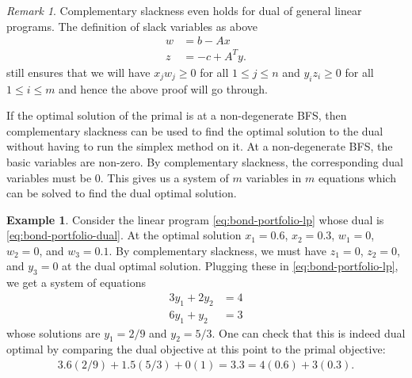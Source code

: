 \documentclass[
]{book}
\theoremstyle{definition}
\theoremstyle{definition}
\newtheorem{example}{Example}[chapter]
\theoremstyle{definition}
\theoremstyle{definition}
\theoremstyle{remark}
\newtheorem*{remark}{Remark}
\begin{document}
\begin{remark}
Complementary slackness even holds for dual of general linear programs. The definition of slack variables as above
\begin{align*}
  w &= b - A x \\ 
  z &= -c + A^T y.
\end{align*}
still ensures that we will have \(x_j w_j \ge 0\) for all \(1 \le j \le n\) and \(y_i z_i \ge 0\) for all \(1 \le i \le m\) and hence the above proof will go through.
\end{remark}

If the optimal solution of the primal is at a non-degenerate BFS, then complementary slackness can be used to find the optimal solution to the dual without having to run the simplex method on it.
At a non-degenerate BFS, the basic variables are non-zero.
By complementary slackness, the corresponding dual variables must be 0.
This gives us a system of \(m\) variables in \(m\) equations which can be solved to find the dual optimal solution.

\begin{example}
Consider the linear program \eqref{eq:bond-portfolio-lp} whose dual is \eqref{eq:bond-portfolio-dual}. At the optimal solution \(x_1 = 0.6\), \(x_2 = 0.3\), \(w_1 = 0\), \(w_2 = 0\), and \(w_3 = 0.1\).
By complementary slackness, we must have \(z_1 = 0\), \(z_2 = 0\), and \(y_3 = 0\) at the dual optimal solution.
Plugging these in \eqref{eq:bond-portfolio-lp}, we get a system of equations
\begin{align*}
  3y_1 + 2y_2 &= 4 \\
  6y_1 + y_2 &= 3 
\end{align*}
whose solutions are \(y_1 = 2/9\) and \(y_2 = 5/3\).
One can check that this is indeed dual optimal by comparing the dual objective at this point to the primal objective:
\begin{align*}
  3.6 (2/9) + 1.5 (5/3) + 0 (1) = 3.3 = 4 (0.6) + 3 (0.3).
\end{align*}
\end{example}
\end{document}
